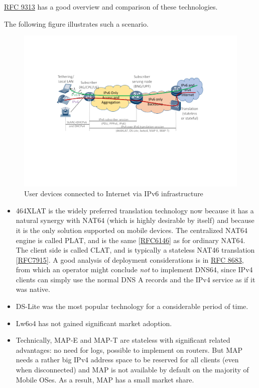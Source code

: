 \documentclass[
]{article}
\begin{document}
\href{https://www.rfc-editor.org/info/rfc9313}{RFC 9313} has a good
overview and comparison of these technologies.

The following figure illustrates such a scenario.

\begin{figure}
\centering
\includegraphics{vasilenko-IPv4aaS.png}
\caption{User devices connected to Internet via IPv6 infrastructure}
\end{figure}

\begin{itemize}
\item
  464XLAT is the widely preferred translation technology now because it
  has a natural synergy with NAT64 (which is highly desirable by itself)
  and because it is the only solution supported on mobile devices. The
  centralized NAT64 engine is called PLAT, and is the same
  {[}\href{https://www.rfc-editor.org/info/rfc6146}{RFC6146}{]} as for
  ordinary NAT64. The client side is called CLAT, and is typically a
  stateless NAT46 translation
  {[}\href{https://www.rfc-editor.org/info/rfc7915}{RFC7915}{]}. A good
  analysis of deployment considerations is in
  \href{https://www.rfc-editor.org/info/rfc8683}{RFC 8683}, from which
  an operator might conclude \emph{not} to implement DNS64, since IPv4
  clients can simply use the normal DNS A records and the IPv4 service
  as if it was native.
\item
  DS-Lite was the most popular technology for a considerable period of
  time.
\item
  Lw6o4 has not gained significant market adoption.
\item
  Technically, MAP-E and MAP-T are stateless with significant related
  advantages: no need for logs, possible to implement on routers. But
  MAP needs a rather big IPv4 address space to be reserved for all
  clients (even when disconnected) and MAP is not available by default
  on the majority of Mobile OSes. As a result, MAP has a small market
  share.
\end{itemize}
\end{document}
